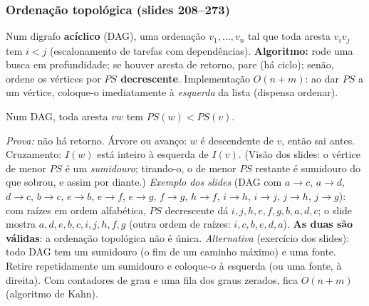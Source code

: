 \subsubsection{Ordenação topológica (slides 208--273)}\label{sec:topo}
Num digrafo \textbf{acíclico} (DAG), uma ordenação $v_1,\dots,v_n$ tal que toda aresta $v_iv_j$ tem $i<j$ (escalonamento de tarefas com dependências). \textbf{Algoritmo:} rode uma busca em profundidade; se houver aresta de retorno, pare (há ciclo); senão, ordene os vértices por \textbf{$PS$ decrescente}. Implementação $O(n+m)$: ao dar $PS$ a um vértice, coloque-o imediatamente à \emph{esquerda} da lista (dispensa ordenar).
\begin{teo}[Correção]
Num DAG, toda aresta $vw$ tem $PS(w)<PS(v)$.
\end{teo}
\emph{Prova:} não há retorno. Árvore ou avanço: $w$ é descendente de $v$, então sai antes. Cruzamento: $I(w)$ está inteiro à esquerda de $I(v)$. (Visão dos slides: o vértice de menor $PS$ é um \emph{sumidouro}; tirando-o, o de menor $PS$ restante é sumidouro do que sobrou, e assim por diante.)
\emph{Exemplo dos slides} (DAG com $a{\to}c$, $a{\to}d$, $d{\to}c$, $b{\to}c$, $e{\to}b$, $e{\to}f$, $e{\to}g$, $f{\to}g$, $h{\to}f$, $i{\to}h$, $i{\to}j$, $j{\to}h$, $j{\to}g$): com raízes em ordem alfabética, $PS$ decrescente dá $i,j,h,e,f,g,b,a,d,c$; o slide mostra $a,d,e,b,c,i,j,h,f,g$ (outra ordem de raízes: $i,c,b,e,d,a$). \textbf{As duas são válidas}: a ordenação topológica não é única.
\emph{Alternativa} (exercício dos slides): todo DAG tem um sumidouro (o fim de um caminho máximo) e uma fonte. Retire repetidamente um sumidouro e coloque-o à esquerda (ou uma fonte, à direita). Com contadores de grau e uma fila dos graus zerados, fica $O(n+m)$ (algoritmo de Kahn).

